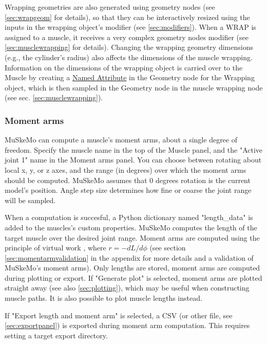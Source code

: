 \documentclass{article}
\begin{document}
Wrapping geometries are also generated using geometry nodes (see \ref{sec:wrapgeom} for details), so that they can be interactively resized using the inputs in the wrapping object's modifier (see \ref{sec:modifiers}). When a WRAP is assigned to a muscle, it receives a very complex geometry nodes modifier (see \ref{sec:musclewrapping} for details). Changing the wrapping geometry dimensions (e.g., the cylinder's radius) also affects the dimensions of the muscle wrapping. Information on the dimensions of the wrapping object is carried over to the Muscle by creating a \href{https://docs.blender.org/manual/en/latest/modeling/geometry_nodes/geometry/read/named_attribute.html}{Named Attribute} in the Geometry node for the Wrapping object, which is then sampled in the Geometry node in the muscle wrapping node (see sec. \ref{sec:musclewrapping}).



\subsubsection{Moment arms}

MuSkeMo can compute a muscle's moment arms, about a single degree of freedom. Specify the muscle name in the top of the Muscle panel, and the "Active joint 1"  name in the Moment arms panel. You can choose between rotating about local x, y, or z axes, and the range (in degrees) over which the moment arms should be computed. MuSkeMo assumes that 0 degrees rotation is the current model's position. Angle step size determines how fine or coarse the joint range will be sampled. 

When a computation is succesful, a Python dictionary named "length\_data" is added to the muscles's custom properties. MuSkeMo computes the length of the target muscle over the desired joint range. Moment arms are computed using the principle of virtual work \cite{storaceFunctionalAnalysisRole1979,anDeterminationMuscleOrientations1984}, where \(r = -dL / d\phi \) (see section \ref{sec:momentarmvalidation} in the appendix for more details and a validation of MuSkeMo's moment arms). Only lengths are stored, moment arms are computed during plotting or export. If "Generate plot" is selected, moment arms are plotted straight away (see also \ref{sec:plotting}), which may be useful when constructing muscle paths. It is also possible to plot muscle lengths instead.

If "Export length and moment arm" is selected, a CSV (or other file, see \ref{sec:exportpanel}) is exported during moment arm computation. This requires setting a target export directory.
\end{document}

